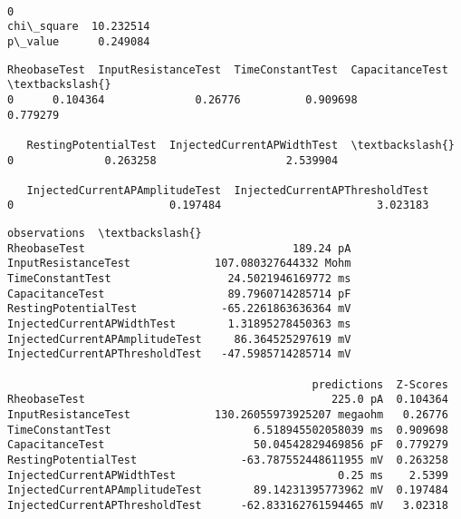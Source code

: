     
    \begin{center}
    \end{center}
    { \hspace*{\fill} \\}
    
            \begin{tcolorbox}[breakable, size=fbox, boxrule=.5pt, pad at break*=1mm, opacityfill=0]
\begin{Verbatim}[commandchars=\\\{\}]
                    0
chi\_square  10.232514
p\_value      0.249084
\end{Verbatim}
\end{tcolorbox}
        
            \begin{tcolorbox}[breakable, size=fbox, boxrule=.5pt, pad at break*=1mm, opacityfill=0]
\begin{Verbatim}[commandchars=\\\{\}]
   RheobaseTest  InputResistanceTest  TimeConstantTest  CapacitanceTest  \textbackslash{}
0      0.104364              0.26776          0.909698         0.779279

   RestingPotentialTest  InjectedCurrentAPWidthTest  \textbackslash{}
0              0.263258                    2.539904

   InjectedCurrentAPAmplitudeTest  InjectedCurrentAPThresholdTest
0                        0.197484                        3.023183
\end{Verbatim}
\end{tcolorbox}
        
            \begin{tcolorbox}[breakable, size=fbox, boxrule=.5pt, pad at break*=1mm, opacityfill=0]
\begin{Verbatim}[commandchars=\\\{\}]
                                         observations  \textbackslash{}
RheobaseTest                                189.24 pA
InputResistanceTest             107.080327644332 Mohm
TimeConstantTest                  24.5021946169772 ms
CapacitanceTest                   89.7960714285714 pF
RestingPotentialTest             -65.2261863636364 mV
InjectedCurrentAPWidthTest        1.31895278450363 ms
InjectedCurrentAPAmplitudeTest     86.364525297619 mV
InjectedCurrentAPThresholdTest   -47.5985714285714 mV

                                               predictions  Z-Scores
RheobaseTest                                      225.0 pA  0.104364
InputResistanceTest             130.26055973925207 megaohm   0.26776
TimeConstantTest                      6.518945502058039 ms  0.909698
CapacitanceTest                       50.04542829469856 pF  0.779279
RestingPotentialTest                -63.787552448611955 mV  0.263258
InjectedCurrentAPWidthTest                         0.25 ms    2.5399
InjectedCurrentAPAmplitudeTest        89.14231395773962 mV  0.197484
InjectedCurrentAPThresholdTest      -62.833162761594465 mV   3.02318
\end{Verbatim}
\end{tcolorbox}
        
